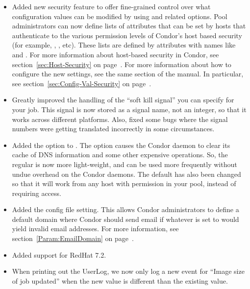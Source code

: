 \begin{itemize}
\item Added new security feature to offer fine-grained control over
what configuration values can be modified by 
using  and related options.
Pool administrators can now define lists of attributes that can be set
by hosts that authenticate to the various permission levels of
Condor's host based security (for example, ,
, etc).
These lists are defined by attributes with names like
 and
. 
For more information about host-based security in Condor, see
section~\ref{sec:Host-Security} on page~\pageref{sec:Host-Security}.
For more information about how to configure the new settings, see the
same section of the manual.
In particular, see section~\ref{sec:Config-Val-Security} on
page~\pageref{sec:Config-Val-Security}. 

\item Greatly improved the handling of the ``soft kill signal'' you
can specify for your job.
This signal is now stored as a signal name, not an integer, so that it
works across different platforms.
Also, fixed some bugs where the signal numbers were getting translated
incorrectly in some circumstances.

\item Added the  option to .
The  option causes the Condor daemon to clear its cache of
DNS information and some other expensive operations.
So, the regular  is now more light-weight, and can
be used more frequently without undue overhead on the Condor daemons. 
The default  has also been changed so that it will
work from any host with  permission in your pool,
instead of requiring  access.

\item Added the  config file setting.
This allows Condor administrators to define a default domain where
Condor should send email if whatever  is set to
would yield invalid email addresses.
For more information, see section~\ref{Param:EmailDomain} on
page~\pageref{Param:EmailDomain}.

\item
Added support for RedHat 7.2.

\item When printing out the UserLog, we now only log a new event for
``Image size of job updated'' when the new value is different than the
existing value.

\end{itemize}


